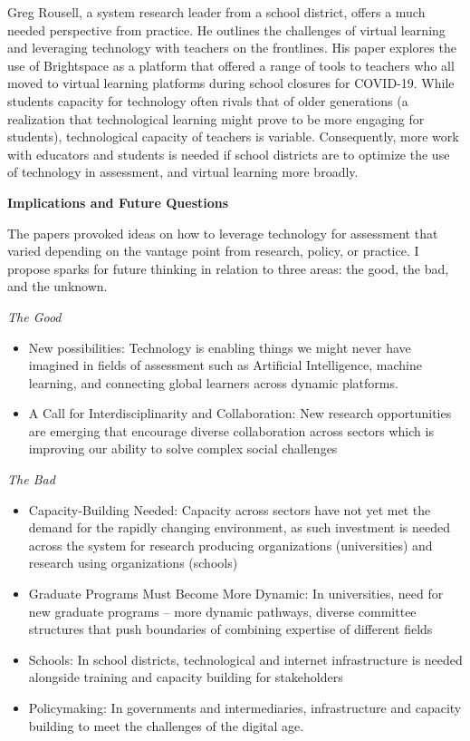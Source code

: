 \documentclass[
]{book}
\begin{document}
Greg Rousell, a system research leader from a school district, offers a much needed perspective from practice. He outlines the challenges of virtual learning and leveraging technology with teachers on the frontlines. His paper explores the use of Brightspace as a platform that offered a range of tools to teachers who all moved to virtual learning platforms during school closures for COVID-19. While students capacity for technology often rivals that of older generations (a realization that technological learning might prove to be more engaging for students), technological capacity of teachers is variable. Consequently, more work with educators and students is needed if school districts are to optimize the use of technology in assessment, and virtual learning more broadly.

\textbf{Implications and Future Questions}

The papers provoked ideas on how to leverage technology for assessment that varied depending on the vantage point from research, policy, or practice. I propose sparks for future thinking in relation to three areas: the good, the bad, and the unknown.

\emph{The Good}

\begin{itemize}
\item
  New possibilities: Technology is enabling things we might never have imagined in fields of assessment such as Artificial Intelligence, machine learning, and connecting global learners across dynamic platforms.
\item
  A Call for Interdisciplinarity and Collaboration: New research opportunities are emerging that encourage diverse collaboration across sectors which is improving our ability to solve complex social challenges
\end{itemize}

\emph{The Bad}

\begin{itemize}
\item
  Capacity-Building Needed: Capacity across sectors have not yet met the demand for the rapidly changing environment, as such investment is needed across the system for research producing organizations (universities) and research using organizations (schools)
\item
  Graduate Programs Must Become More Dynamic: In universities, need for new graduate programs -- more dynamic pathways, diverse committee structures that push boundaries of combining expertise of different fields
\item
  Schools: In school districts, technological and internet infrastructure is needed alongside training and capacity building for stakeholders
\item
  Policymaking: In governments and intermediaries, infrastructure and capacity building to meet the challenges of the digital age.
\end{itemize}
\end{document}

